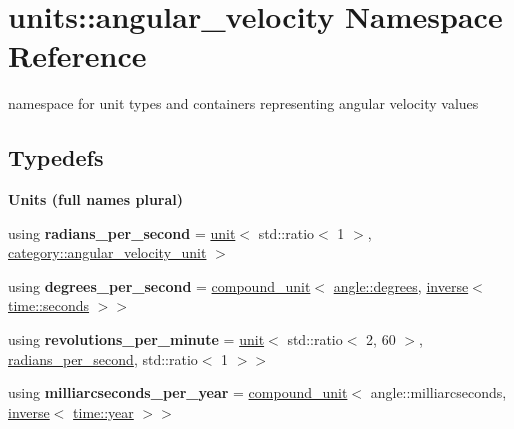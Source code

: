 \hypertarget{namespaceunits_1_1angular__velocity}{}\section{units\+:\+:angular\+\_\+velocity Namespace Reference}
\label{namespaceunits_1_1angular__velocity}


namespace for unit types and containers representing angular velocity values  


\subsection*{Typedefs}
\begin{Indent}{\bf Units (full names plural)}\par
\begin{DoxyCompactItemize}
\item 
\hypertarget{namespaceunits_1_1angular__velocity_a6d35a24694cdf253217266e0efb5c922}{}using {\bfseries radians\+\_\+per\+\_\+second} = \hyperlink{structunits_1_1unit}{unit}$<$ std\+::ratio$<$ 1 $>$, \hyperlink{namespaceunits_1_1category_acb7b5604c20499976d9eeb13d2871536}{category\+::angular\+\_\+velocity\+\_\+unit} $>$\label{namespaceunits_1_1angular__velocity_a6d35a24694cdf253217266e0efb5c922}

\item 
\hypertarget{namespaceunits_1_1angular__velocity_a73e5670a70a6b67e80105f1aee782ffc}{}using {\bfseries degrees\+\_\+per\+\_\+second} = \hyperlink{group___unit_types_ga9c3f6f077dc894620e1ed8358442a8f1}{compound\+\_\+unit}$<$ \hyperlink{structunits_1_1unit}{angle\+::degrees}, \hyperlink{group___unit_manipulators_gaacc539ef162e24b260d023d3ff949b57}{inverse}$<$ \hyperlink{structunits_1_1unit}{time\+::seconds} $>$$>$\label{namespaceunits_1_1angular__velocity_a73e5670a70a6b67e80105f1aee782ffc}

\item 
\hypertarget{namespaceunits_1_1angular__velocity_a2f5136a603cf17e2e3285649a38dd29e}{}using {\bfseries revolutions\+\_\+per\+\_\+minute} = \hyperlink{structunits_1_1unit}{unit}$<$ std\+::ratio$<$ 2, 60 $>$, \hyperlink{structunits_1_1unit}{radians\+\_\+per\+\_\+second}, std\+::ratio$<$ 1 $>$$>$\label{namespaceunits_1_1angular__velocity_a2f5136a603cf17e2e3285649a38dd29e}

\item 
\hypertarget{namespaceunits_1_1angular__velocity_ac7eecbcd5838da5fc5ec720fe1701aee}{}using {\bfseries milliarcseconds\+\_\+per\+\_\+year} = \hyperlink{group___unit_types_ga9c3f6f077dc894620e1ed8358442a8f1}{compound\+\_\+unit}$<$ angle\+::milliarcseconds, \hyperlink{group___unit_manipulators_gaacc539ef162e24b260d023d3ff949b57}{inverse}$<$ \hyperlink{structunits_1_1unit}{time\+::year} $>$$>$\label{namespaceunits_1_1angular__velocity_ac7eecbcd5838da5fc5ec720fe1701aee}

\end{DoxyCompactItemize}
\end{Indent}
